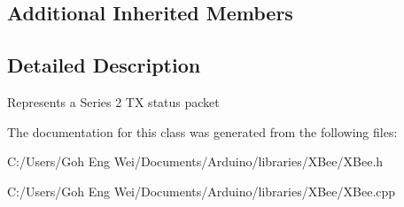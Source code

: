 \subsection*{Additional Inherited Members}


\subsection{Detailed Description}
Represents a Series 2 TX status packet 

The documentation for this class was generated from the following files\+:\begin{DoxyCompactItemize}
\item 
C\+:/\+Users/\+Goh Eng Wei/\+Documents/\+Arduino/libraries/\+X\+Bee/X\+Bee.\+h\item 
C\+:/\+Users/\+Goh Eng Wei/\+Documents/\+Arduino/libraries/\+X\+Bee/X\+Bee.\+cpp\end{DoxyCompactItemize}
